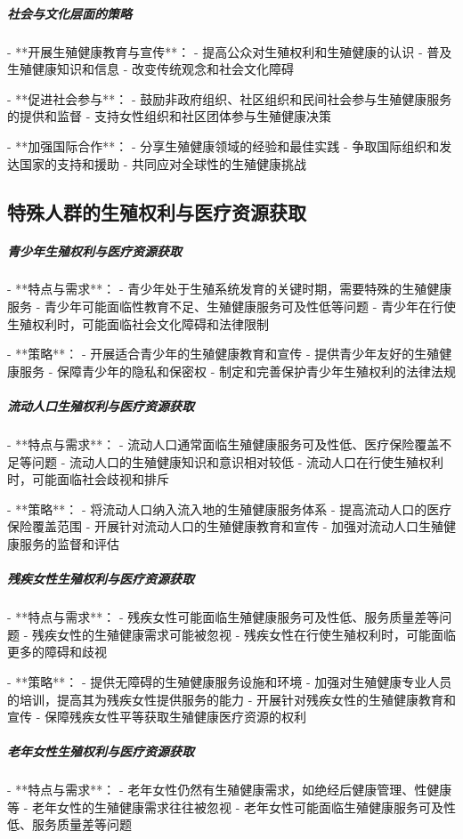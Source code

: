 \begin{enumerate}
\subparagraph{社会与文化层面的策略}

- **开展生殖健康教育与宣传**：
  - 提高公众对生殖权利和生殖健康的认识
  - 普及生殖健康知识和信息
  - 改变传统观念和社会文化障碍

- **促进社会参与**：
  - 鼓励非政府组织、社区组织和民间社会参与生殖健康服务的提供和监督
  - 支持女性组织和社区团体参与生殖健康决策

- **加强国际合作**：
  - 分享生殖健康领域的经验和最佳实践
  - 争取国际组织和发达国家的支持和援助
  - 共同应对全球性的生殖健康挑战

\subsection{特殊人群的生殖权利与医疗资源获取}

\subparagraph{青少年生殖权利与医疗资源获取}

- **特点与需求**：
  - 青少年处于生殖系统发育的关键时期，需要特殊的生殖健康服务
  - 青少年可能面临性教育不足、生殖健康服务可及性低等问题
  - 青少年在行使生殖权利时，可能面临社会文化障碍和法律限制

- **策略**：
  - 开展适合青少年的生殖健康教育和宣传
  - 提供青少年友好的生殖健康服务
  - 保障青少年的隐私和保密权
  - 制定和完善保护青少年生殖权利的法律法规

\subparagraph{流动人口生殖权利与医疗资源获取}

- **特点与需求**：
  - 流动人口通常面临生殖健康服务可及性低、医疗保险覆盖不足等问题
  - 流动人口的生殖健康知识和意识相对较低
  - 流动人口在行使生殖权利时，可能面临社会歧视和排斥

- **策略**：
  - 将流动人口纳入流入地的生殖健康服务体系
  - 提高流动人口的医疗保险覆盖范围
  - 开展针对流动人口的生殖健康教育和宣传
  - 加强对流动人口生殖健康服务的监督和评估

\subparagraph{残疾女性生殖权利与医疗资源获取}

- **特点与需求**：
  - 残疾女性可能面临生殖健康服务可及性低、服务质量差等问题
  - 残疾女性的生殖健康需求可能被忽视
  - 残疾女性在行使生殖权利时，可能面临更多的障碍和歧视

- **策略**：
  - 提供无障碍的生殖健康服务设施和环境
  - 加强对生殖健康专业人员的培训，提高其为残疾女性提供服务的能力
  - 开展针对残疾女性的生殖健康教育和宣传
  - 保障残疾女性平等获取生殖健康医疗资源的权利

\subparagraph{老年女性生殖权利与医疗资源获取}

- **特点与需求**：
  - 老年女性仍然有生殖健康需求，如绝经后健康管理、性健康等
  - 老年女性的生殖健康需求往往被忽视
  - 老年女性可能面临生殖健康服务可及性低、服务质量差等问题


\end{enumerate}
